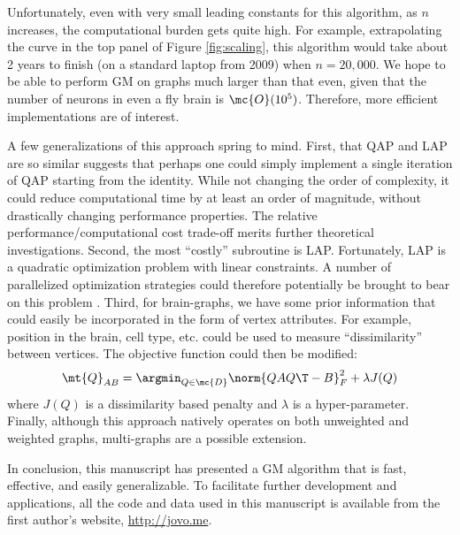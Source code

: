 \documentclass[10pt,journal,cspaper,compsoc]{IEEEtran}
\begin{document}
Unfortunately, even with very small leading constants for this algorithm, as $n$ increases, the computational burden gets quite high.  For example, extrapolating the curve in the top panel of Figure \ref{fig:scaling}, this algorithm would take about 2 years to finish (on a standard laptop from 2009) when $n=20,000$.  We hope to be able to perform GM on graphs much larger than that even, given that the number of neurons in even a fly brain is $\mc{O}(10^5)$.  Therefore, more efficient implementations are of interest.  

A few generalizations of this approach spring to mind.  First, that QAP and LAP are so similar suggests that perhaps one could simply implement a single iteration of QAP starting from the identity.  While not changing the order of complexity, it could reduce computational time by at least an order of magnitude, without drastically changing performance properties.  The relative performance/computational cost trade-off merits further theoretical investigations.  Second, the most ``costly'' subroutine is LAP.  Fortunately, LAP is a quadratic optimization problem with linear constraints.  A number of parallelized optimization strategies could therefore potentially be brought to bear on this problem \cite{Boyd2011}.  Third, for brain-graphs, we have some prior information that could easily be incorporated in the form of vertex attributes.  For example, position in the brain, cell type, etc. could be used to measure ``dissimilarity'' between vertices.  The objective function could then be modified:
\begin{align} \label{eq:tqap}
	\mt{Q}_{AB}= \argmin_{Q \in \mc{D}} \norm{Q A Q\T - B}^2_F + \lambda J(Q)
\end{align}
where $J(Q)$ is a dissimilarity based penalty and $\lambda$ is a hyper-parameter.  Finally, although this approach natively operates on both unweighted and weighted graphs, multi-graphs are a possible extension.

In conclusion, this manuscript has presented a GM algorithm that is fast, effective, and easily generalizable.  To facilitate further development and applications, all the code and data used in this manuscript is available from the first author's website, \url{http://jovo.me}.












\ifCLASSOPTIONcompsoc
\end{document}
